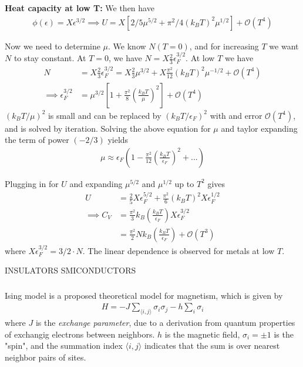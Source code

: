 \documentclass[a4paper, english, 12pt]{article}
\newcommand{\eps}{\epsilon}
\newcommand{\closed}[1]{\left( #1 \right)}
\newcommand{\bracket}[1]{\left[ #1 \right]}
\begin{document}
\begin{multicols*}{2}
\textbf{Heat capacity at low T:} We then have 
\begin{align*}
    \phi(\eps)=X\eps^{3/2}\implies U=X[2/5 \mu^{5/2} + \pi^2/4 (k_B T)^2 \mu^{1/2}] + \mathcal{O}(T^4)
\end{align*}

Now we need to determine $\mu$. We know $N(T=0)$, and for increasing $T$ we want $N$ to stay constant. At $T=0$, we have $N=X\frac{2}{3}\eps_F^{3/2}$. At low $T$ we have 
\begin{align*}
    N &= X \frac{2}{3}\eps_F^{3/2} = X \frac{2}{3}\mu^{3/2} + X\frac{\pi^2}{12} (k_B T)^{2} \mu^{-1/2} + \mathcal{O}(T^4) \\ 
    \implies \eps_F^{3/2} &= \mu^{3/2}\bracket{1+\frac{\pi^2}{8}\closed{\frac{k_B T}{\mu}}^2 } + \mathcal{O}(T^4)
\end{align*}
$(k_B T/\mu)^2$ is small and can be replaced by $(k_B T/\eps_F)^2$ with and error $\mathcal{O}(T^4)$, and is solved by iteration. Solving the above equation for $\mu$ and taylor expanding the term of power $(-2/3)$ yields 
\begin{align*}
    \mu \approx \eps_F \closed{1 - \frac{\pi^2}{12} \closed{\frac{k_B T}{\eps_F}}^2+...}
\end{align*}

Plugging in for $U$ and expanding $\mu^{5/2}$ and $\mu^{1/2}$ up to $T^2$ gives 
\begin{align*}
    U &= \frac{2}{5}X\eps_F^{5/2} + \frac{\pi^2}{6}(k_B T)^2 X\eps_F^{1/2} \\ 
    \implies C_V &= \frac{\pi^2}{3}k_B \closed{\frac{k_B T}{\eps_F}} X \eps_F^{3/2} \\ 
    &= \frac{\pi^2}{2} Nk_B \closed{\frac{k_B T}{\eps_F}} + \mathcal{O}(T^3)
\end{align*}
where $X\eps_F^{3/2}=3/2\cdot N $. The linear dependence is observed for metals at low $T$. 

INSULATORS SMICONDUCTORS 


\subsubsection*{}
Ising model is a proposed theoretical model for magnetism, which is given by 
\begin{align*}
    H = -J \sum_{\langle{i,j}\rangle} \sigma_i \sigma_j - h \sum_i \sigma_i 
\end{align*}
where $J$ is the \textit{exchange parameter}, due to a derivation from quantum properties of exchangig electrons between neighbors. $h$ is the magnetic field, $\sigma_i=\pm1$ is the "spin", and the summation index $\langle i,j \rangle$ indicates that the sum is over nearest neighbor pairs of sites. 


\end{multicols*}
\end{document}
